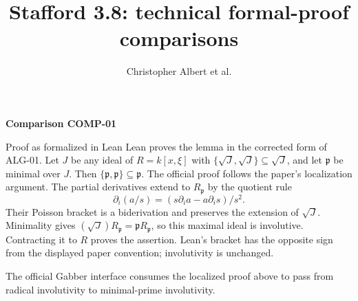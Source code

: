 \documentclass[11pt]{amsart}
\title{Stafford 3.8: technical formal-proof comparisons}
\author{Christopher Albert et al.}
\date{}
\numberwithin{equation}{section}
\theoremstyle{plain}
\theoremstyle{remark}
\begin{document}
\maketitle

\par\bigskip\noindent{}\hypertarget{comparison-COMP-01}{\textbf{Comparison COMP-01}}\label{comparison-COMP-01}\par\smallskip
{}
\begin{AIaddition}{Proof as formalized in Lean}
Lean proves the lemma in the corrected form of ALG-01. Let $J$ be any ideal
of $R=k[x,\xi]$ with $\{\sqrt J,\sqrt J\}\subseteq\sqrt J$, and let
$\mathfrak p$ be minimal over $J$. Then
$\{\mathfrak p,\mathfrak p\}\subseteq\mathfrak p$. The official proof
follows the paper's localization argument. The partial derivatives extend
to $R_{\mathfrak p}$ by the quotient rule
\[
\partial_i(a/s)=(s\partial_i a-a\partial_i s)/s^2.
\]
Their Poisson bracket is a biderivation and preserves the extension of
$\sqrt J$. Minimality gives
$(\sqrt J)R_{\mathfrak p}=\mathfrak pR_{\mathfrak p}$, so this maximal
ideal is involutive. Contracting it to $R$ proves the assertion. Lean's
bracket has the opposite sign from the displayed paper convention;
involutivity is unchanged.

The official Gabber interface consumes the localized proof above to pass
from radical involutivity to minimal-prime involutivity.
\end{AIaddition}
\end{document}
